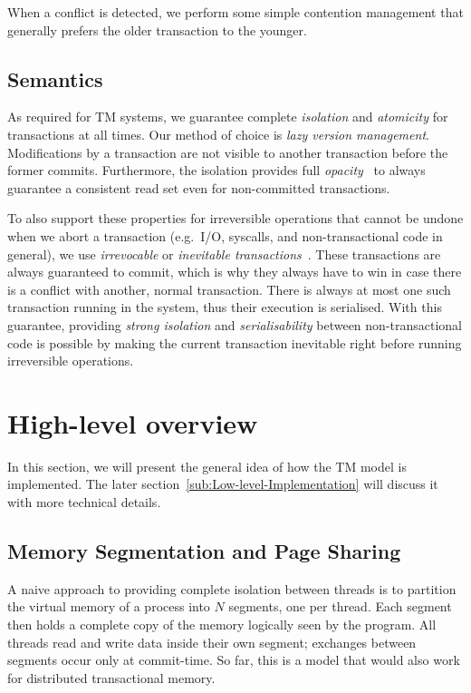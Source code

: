\documentclass{sigplanconf}
\begin{document}
When a conflict is detected, we perform some simple contention
management that generally prefers the older transaction to the younger.

\subsection{Semantics}

As required for TM systems, we guarantee complete \emph{isolation} and
\emph{atomicity} for transactions at all times. Our method of choice
is \emph{lazy version management}. Modifications by a transaction are
not visible to another transaction before the former commits.
Furthermore, the isolation provides full
\emph{opacity}~\cite{guerraoui08} to always guarantee a consistent
read set even for non-committed transactions.

To also support these properties for irreversible operations that
cannot be undone when we abort a transaction (e.g.\ I/O, syscalls, and
non-transactional code in general), we use \emph{irrevocable} or
\emph{inevitable transactions}~\cite{blundell06,spear08}. These transactions are always
guaranteed to commit, which is why they always have to win in case
there is a conflict with another, normal transaction. There is always
at most one such transaction running in the system, thus their
execution is serialised. With this guarantee, providing \emph{strong
isolation} and \emph{serialisability} between non-transactional code
is possible by making the current transaction inevitable right before
running irreversible operations.



\section{High-level overview}

In this section, we will present the general idea of how the TM model is
implemented.  The later section~\ref{sub:Low-level-Implementation} will
discuss it with more technical details.

\subsection{Memory Segmentation and Page Sharing}

A naive approach to providing complete isolation between threads is to
partition the virtual memory of a process into $N$ segments, one per
thread.  Each segment then holds a complete copy of the memory logically
seen by the program.  All threads read and write data inside their own
segment; exchanges between segments occur only at commit-time.  So far,
this is a model that would also work for distributed transactional
memory.
\end{document}
